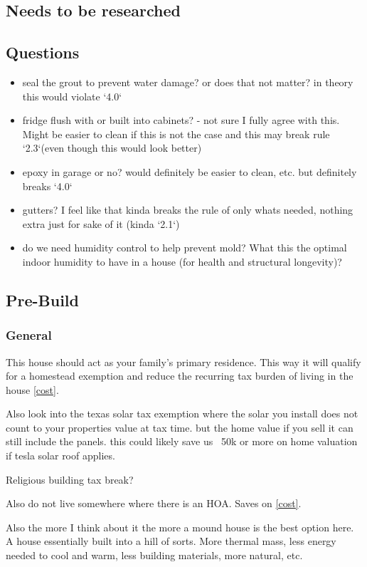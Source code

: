 \documentclass{article}
\begin{document}
\subsection{Needs to be researched}

\subsection{Questions}
\begin{itemize}
    \item seal the grout to prevent water damage? or does that not matter? in theory this would violate `4.0`
    \item fridge flush with or built into cabinets? - not sure I fully agree with this. Might be easier to clean if this is not the case and this may break rule `2.3`(even though this would look better)
    \item epoxy in garage or no? would definitely be easier to clean, etc. but definitely breaks `4.0`
    \item gutters? I feel like that kinda breaks the rule of only whats needed, nothing extra just for sake of it (kinda `2.1`)
    \item do we need humidity control to help prevent mold? What this the optimal indoor humidity to have in a house (for health and structural longevity)?
\end{itemize}

\subsection{Pre-Build}
\subsubsection{General}
This house should act as your family's primary residence. This way it will qualify for a homestead exemption and reduce the recurring tax burden of living in the house \ref{cost}.

Also look into the texas solar tax exemption where the solar you install does not count to your properties value at tax time. but the home value if you sell it can still include the panels. this could likely save us ~50k or more on home valuation if tesla solar roof applies.

Religious building tax break?

Also do not live somewhere where there is an HOA. Saves on \ref{cost}.

Also the more I think about it the more a mound house is the best option here. A house essentially built into a hill of sorts. More thermal mass, less energy needed to cool and warm, less building materials, more natural, etc.
\end{document}
